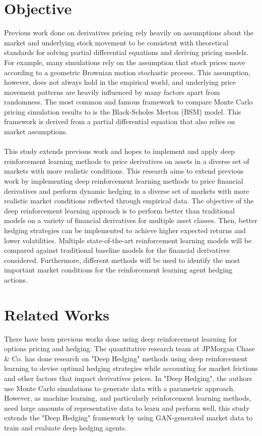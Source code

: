 \section{Objective}

Previous work done on derivatives pricing rely heavily on assumptions about the market and underlying stock movement to be consistent with theoretical standards for solving partial differential equations and deriving pricing models. For example, many simulations rely on the assumption that stock prices move according to a geometric Brownian motion stochastic process. This assumption, however, does not always hold in the empirical world, and underlying price movement patterns are heavily influenced by many factors apart from randomness. The most common and famous framework to compare Monte Carlo pricing simulation results to is the Black-Scholes Merton (BSM) model. This framework is derived from a partial differential equation that also relies on market assumptions.
\\
\\
This study extends previous work and hopes to implement and apply deep reinforcement learning methods to price derivatives on assets in a diverse set of markets with more realistic conditions. This research aims to extend previous work by implementing deep reinforcement learning methods to price financial derivatives and perform dynamic hedging in a diverse set of markets with more realistic market conditions reflected through empirical data. The objective of the deep reinforcement learning approach is to perform better than traditional models on a variety of financial derivatives for multiple asset classes. Then, better hedging strategies can be implemented to achieve higher expected returns and lower volatilities. Multiple state-of-the-art reinforcement learning models will be compared against traditional baseline models for the financial derivatives considered. Furthermore, different methods will be used to identify the most important market conditions for the reinforcement learning agent hedging actions.

\section{Related Works}

There have been previous works done using deep reinforcement learning for options pricing and hedging. The quantitative research team at JPMorgan Chase \& Co. has done research on "Deep Hedging" methods using deep reinforcement learning to devise optimal hedging strategies while accounting for market frictions and other factors that impact derivatives prices. In "Deep Hedging", the authors use Monte Carlo simulations to generate data with a parametric approach. However, as machine learning, and particularly reinforcement learning methods, need large amounts of representative data to learn and perform well, this study extends the "Deep Hedging" framework by using GAN-generated market data to train and evaluate deep hedging agents.